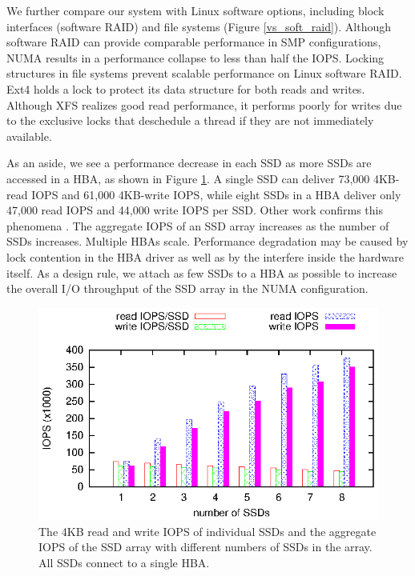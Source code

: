 We further compare our system with Linux software options, including 
block interfaces (software RAID) and file systems (Figure \ref{vs_soft_raid}).
Although software RAID can provide comparable performance in SMP configurations, 
NUMA results in a performance collapse to less than half the IOPS.   
Locking structures in file systems prevent scalable performance
on Linux software RAID.
Ext4 holds a lock to protect its data structure for both reads and writes.
Although XFS realizes good read performance, it performs poorly for writes
due to the exclusive locks that deschedule a thread if they are not
immediately available.

As an aside, we see a performance decrease in each SSD as more SSDs are
accessed in a HBA, as shown in Figure \ref{ssd_perf}. A single SSD can deliver
73,000 4KB-read IOPS and 61,000 4KB-write IOPS, while eight SSDs in a HBA
deliver only 47,000 read IOPS and 44,000 write IOPS per SSD.
Other work confirms this phenomena \cite{Foong10}. The aggregate IOPS
of an SSD array increases as the number of SSDs increases. Multiple HBAs scale.
Performance degradation may be caused by lock contention in the HBA driver
as well as by the interfere inside the hardware itself. As a design rule, 
we attach as few SSDs to a HBA as possible to increase the overall I/O throughput of
the SSD array in the NUMA configuration.

\begin{figure}[tb]
\begin{center}
\includegraphics[scale=1]{figs/SAFS/SSD-perf-vs-number.eps}
\caption{The 4KB read and write IOPS of individual SSDs and the aggregate IOPS
	of the SSD array with different numbers of SSDs in the array. All SSDs
	connect to a single HBA.}
\label{ssd_perf}
\end{center}
\end{figure}

